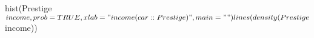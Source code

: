 \begin{Schunk}
\begin{Sinput}
 hist(Prestige$income, prob = TRUE, xlab = "income (car::Prestige)", main = "")
 lines(density(Prestige$income))
\end{Sinput}
\end{Schunk}
